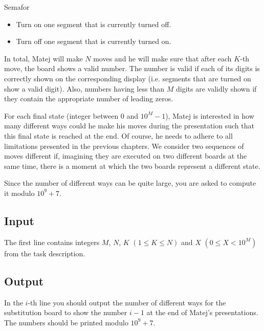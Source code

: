 \begin{statement}[
  problempoints=100,
  timelimit=4 seconds,
  memorylimit=512 MiB,
]{Semafor}
\begin{itemize}
    \item Turn on one segment that is currently turned off.
    \item Turn off one segment that is currently turned on.
\end{itemize}

In total, Matej will make $N$ moves and he will make sure that after each
$K$-th move, the board shows a valid number. The number is valid if each of
its digits is correctly shown on the corresponding display (i.e. segments
that are turned on show a valid digit).  Also, numbers having less than $M$
digits are validly shown if they contain the appropriate number of leading
zeros.

For each final state (integer between $0$ and $10^M-1$), Matej is interested
in how many different ways could he make his moves during the presentation such
that this final state is reached at the end. Of course, he needs to adhere to
all limitations presented in the previous chapters. We consider two sequences
of moves different if, imagining they are executed on two different boards
at the same time, there is a moment at which the two boards represent a different
state.

Since the number of different ways can be quite large, you are asked to compute
it modulo $10^9+7$.
\clearpage

\subsection*{Input}
The first line contains integers $M$, $N$, $K$ $(1 \le K \le N)$ and $X$ $(0
\le X < 10^M)$ from the task description.

\subsection*{Output}
In the $i$-th line you should output the number of different ways for the
substitution board to show the number $i-1$ at the end of Matej's presentations.
The numbers should be printed modulo $10^9 + 7$.


\end{statement}
